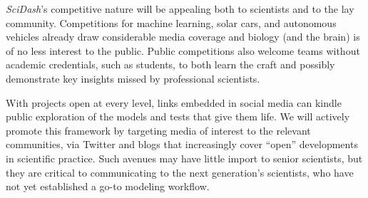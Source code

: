 \documentclass[11pt,letterpaper]{article}
\begin{document}
\textit{SciDash}'s competitive nature will be appealing both to scientists and to the lay community.  Competitions for machine learning, solar cars, and autonomous vehicles already draw considerable media coverage and biology (and the brain) is of no less interest to the public.  Public competitions also welcome teams without academic credentials, such as students, to both learn the craft and possibly demonstrate key insights missed by professional scientists.  

With projects open at every level, links embedded in social media can kindle public exploration of the models and tests that give them life.  We will actively promote this framework by targeting media of interest to the relevant communities, via Twitter and blogs that increasingly cover ``open'' developments in scientific practice.  Such avenues may have little import to senior scientists, but they are critical to communicating to the next generation's scientists, who have not yet established a go-to modeling workflow.   


\end{document}
